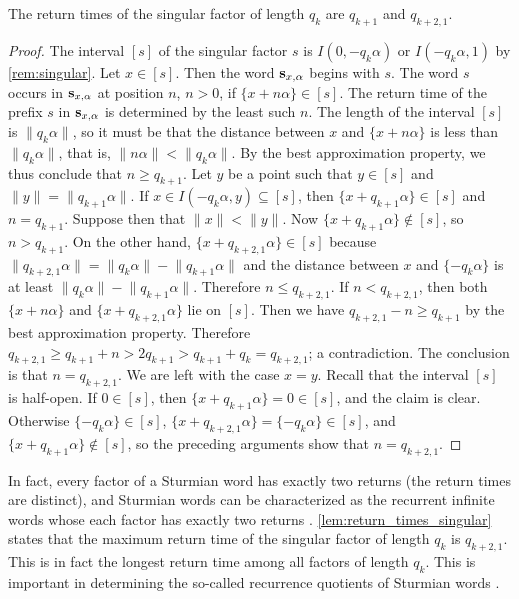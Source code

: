 \documentclass[a4paper,fleqn]{article}
\providecommand{\norm}[1]{\lVert#1\rVert}
\newcommand{\infw}[1]{%
  \ifcat\noexpand#1\relax\bm{#1}%
  \else\mathbf{#1}\fi}          %
\begin{document}
  \begin{lemma}\label{lem:return_times_singular}
    The return times of the singular factor of length $q_k$ are $q_{k+1}$ and $q_{k+2,1}$.
  \end{lemma}
  \begin{proof}
    The interval $[s]$ of the singular factor $s$ is $I(0, -q_k\alpha)$ or $I(-q_k\alpha, 1)$ by
    \autoref{rem:singular}. Let $x \in [s]$. Then the word $\infw{s}_{x,\alpha}$ begins with $s$. The word $s$ occurs
    in $\infw{s}_{x,\alpha}$ at position $n$, $n > 0$, if $\{x + n\alpha\} \in [s]$. The return time of the prefix $s$
    in $\infw{s}_{x,\alpha}$ is determined by the least such $n$. The length of the interval $[s]$ is
    $\norm{q_k\alpha}$, so it must be that the distance between $x$ and $\{x + n\alpha\}$ is less than
    $\norm{q_k\alpha}$, that is, $\norm{n\alpha} < \norm{q_k\alpha}$. By the best approximation property, we thus
    conclude that $n \geq q_{k+1}$. Let $y$ be a point such that $y \in [s]$ and $\norm{y} = \norm{q_{k+1}\alpha}$. If
    $x \in I(-q_k\alpha, y) \subseteq [s]$, then $\{x + q_{k+1}\alpha\} \in [s]$ and $n = q_{k+1}$. Suppose then that
    $\norm{x} < \norm{y}$. Now $\{x + q_{k+1}\alpha\} \notin [s]$, so $n > q_{k+1}$. On the other hand,
    $\{x + q_{k+2,1}\alpha\} \in [s]$ because $\norm{q_{k+2,1}\alpha} = \norm{q_k\alpha} - \norm{q_{k+1}\alpha}$ and
    the distance between $x$ and $\{-q_k\alpha\}$ is at least $\norm{q_k\alpha} - \norm{q_{k+1}\alpha}$. Therefore
    $n \leq q_{k+2,1}$. If $n < q_{k+2,1}$, then both $\{x + n\alpha\}$ and $\{x + q_{k+2,1}\alpha\}$ lie on $[s]$.
    Then we have $q_{k+2,1} - n \geq q_{k+1}$ by the best approximation property. Therefore
    $q_{k+2,1} \geq q_{k+1} + n > 2q_{k+1} > q_{k+1} + q_k = q_{k+2,1}$; a contradiction. The conclusion is that
    $n = q_{k+2,1}$. We are left with the case $x = y$. Recall that the interval $[s]$ is half-open. If $0 \in [s]$,
    then $\{x + q_{k+1}\alpha\} = 0 \in [s]$, and the claim is clear. Otherwise $\{-q_k\alpha\} \in [s]$,
    $\{x + q_{k+2,1}\alpha\} = \{-q_k\alpha\} \in [s]$, and $\{x + q_{k+1}\alpha\} \notin [s]$, so the preceding
    arguments show that $n = q_{k+2,1}$.
  \end{proof}

  In fact, every factor of a Sturmian word has exactly two returns (the return times are distinct), and Sturmian words
  can be characterized as the recurrent infinite words whose each factor has exactly two returns
  \cite{2001:a_characterization_of_sturmian_words_by_return_words,2000:return_words_in_sturmian_and_episturmian_words}.
  \autoref{lem:return_times_singular} states that the maximum return time of the singular factor of length $q_k$ is
  $q_{k+2,1}$. This is in fact the longest return time among all factors of length $q_k$. This is important in
  determining the so-called recurrence quotients of Sturmian words
  \cite{1940:symbolic_dynamics_ii,1999:limit_values_of_the_recurrence_quotient_of_sturmian}.
\end{document}
